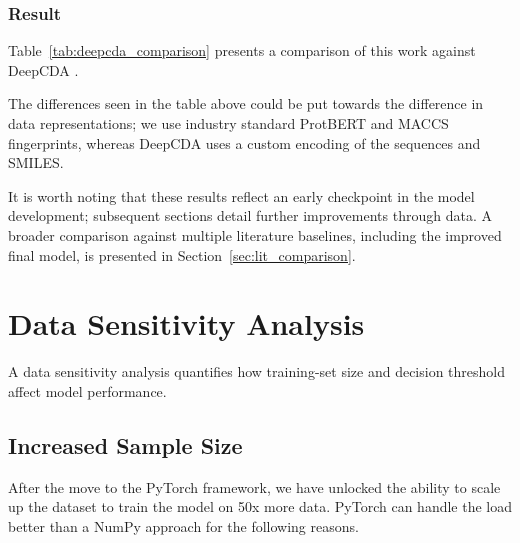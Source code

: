 \subsubsection{Result}
Table~\ref{tab:deepcda_comparison} presents a comparison of this work against DeepCDA \citep{Abbasi2020}.
\begin{table}[H]
\centering
\caption{Performance comparison against literature baseline on BindingDB. DeepCDA results are reported from \citet{Yang2024}, evaluated using 10-fold cross-validation. This work uses a fixed train/validation/test split, so comparison is indicative rather than definitive.}
\label{tab:deepcda_comparison}
%
\end{table}

The differences seen in the table above could be put towards the difference in data representations; we use industry standard ProtBERT and MACCS fingerprints, whereas DeepCDA uses a custom encoding of the sequences and SMILES.

It is worth noting that these results reflect an early checkpoint in the model development; subsequent sections detail further improvements through data.
A broader comparison against multiple literature baselines, including the improved final model, is presented in Section~\ref{sec:lit_comparison}.


\section{Data Sensitivity Analysis}
\label{sec: eval_data}
A data sensitivity analysis quantifies how training-set size and decision threshold affect model performance.
\subsection{Increased Sample Size}
After the move to the PyTorch framework, we have unlocked the ability to scale up the dataset to train the model on 50x more data.
PyTorch can handle the load better than a NumPy approach for the following reasons.

